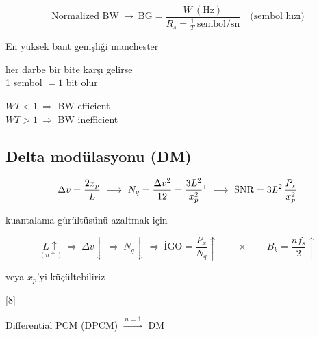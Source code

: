 \documentclass[11pt,a4paper]{article}
\begin{document}
\[ \text{Normalized BW}\ \longrightarrow\ \mathrm{BG}=\frac{W\ (\mathrm{Hz})}{R_s=\frac{1}{T}\ \text{sembol/sn}}\quad\text{(sembol hızı)} \]

En yüksek bant genişliği manchester

her darbe bir bite karşı gelirse\\
1 sembol $=1$ bit olur

$WT<1\ \Rightarrow$ BW efficient\\
$WT>1\ \Rightarrow$ BW inefficient

\subsection{Delta modülasyonu (DM)}

\[ \Delta v=\frac{2x_p}{L}\ \longrightarrow\ N_q=\frac{\Delta v^2}{12}=\frac{3L^2}{x_p^2}\footnotemark\ \longrightarrow\ \mathrm{SNR}=3L^2\,\frac{P_x}{x_p^2} \]

kuantalama gürültüsünü azaltmak için

\[ \underset{(n\uparrow)}{L\uparrow}\ \Rightarrow\ \Delta v\downarrow\ \Rightarrow\ N_q\downarrow\ \Rightarrow\ \text{İGO}=\frac{P_x}{N_q}\uparrow\qquad\times\qquad B_k=\frac{n f_s}{2}\uparrow \]

veya $x_p$'yi küçültebiliriz

[8]

Differential PCM (DPCM) $\xrightarrow{\,n=1\,}$ DM
\end{document}
